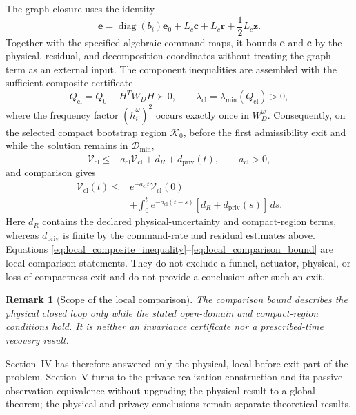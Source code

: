 \documentclass[journal]{IEEEtran}
\newtheorem{remark}{Remark}
\begin{document}
The graph closure uses the identity
\begin{equation}
\bm e=\operatorname{diag}(b_i)\bm e_0+L_c\bm c
+L_c\bm r+\frac{1}{2}L_c\bm z.
\label{eq:local_graph_identity}
\end{equation}
Together with the specified algebraic command maps, it bounds $\bm e$ and $\bm c$
by the physical, residual, and decomposition coordinates without treating the
graph term as an external input. The component inequalities are assembled with
the sufficient composite certificate
\begin{equation}
Q_{\mathrm{cl}}=Q_0-H^T W_DH\succ0,
\qquad
\lambda_{\mathrm{cl}}=\lambda_{\min}(Q_{\mathrm{cl}})>0,
\label{eq:local_composite_certificate}
\end{equation}
where the frequency factor $(\bar h_i^\omega)^2$ occurs exactly once in
$W_D^\omega$. Consequently, on the selected compact bootstrap region
$\mathcal K_0$, before the first
admissibility exit and while the solution remains in $\mathcal D_{\min}$,
\begin{equation}
\dot{\mathscr V}_{\mathrm{cl}}
\leq-a_{\mathrm{cl}}\mathscr V_{\mathrm{cl}}+d_R+d_{\mathrm{priv}}(t),
\qquad a_{\mathrm{cl}}>0,
\label{eq:local_composite_inequality}
\end{equation}
and comparison gives
\begin{align}
\mathscr V_{\mathrm{cl}}(t)
\leq{}&e^{-a_{\mathrm{cl}}t}\mathscr V_{\mathrm{cl}}(0)
\nonumber\\
&+\int_0^t e^{-a_{\mathrm{cl}}(t-s)}
[d_R+d_{\mathrm{priv}}(s)]\,ds.
\label{eq:local_comparison_bound}
\end{align}
Here $d_R$ contains the declared physical-uncertainty and compact-region terms,
whereas $d_{\mathrm{priv}}$ is finite by the command-rate and residual estimates
above. Equations
\eqref{eq:local_composite_inequality}--\eqref{eq:local_comparison_bound} are
local comparison statements. They do not exclude a funnel, actuator, physical,
or loss-of-compactness exit and do not provide a conclusion after such an exit.

\begin{remark}[Scope of the local comparison]
The comparison bound describes the physical closed loop only while the stated
open-domain and compact-region conditions hold. It is neither an invariance
certificate nor a prescribed-time recovery result.
\end{remark}

Section~IV has therefore answered only the physical, local-before-exit part of
the problem. Section~V turns to the private-realization construction and its
passive observation equivalence without upgrading the physical result to a
global theorem; the physical and privacy conclusions remain separate
theoretical results.
\end{document}
